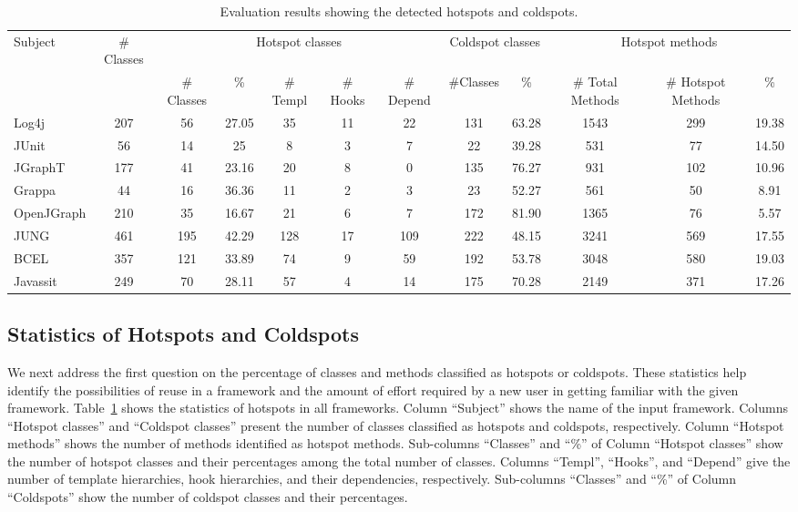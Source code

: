 \documentclass[conference]{IEEEtran}
\newenvironment{CodeOut}{\begin{small}}{\end{small}}
\begin{document}
\setlength{\tabcolsep}{1pt}
\begin{table}[t]
\begin{CodeOut}
\begin{center}
\centering \caption {\label{tab:hotanddead} Evaluation results showing the
detected hotspots and coldspots.}
\begin {tabular} {|l|c|c|c|c|c|c|c|c|c|c|c|}
\hline
Subject&\# Classes&\multicolumn{5}{|c|}{Hotspot classes}&\multicolumn{2}{|c|}{Coldspot classes}&\multicolumn{3}{|c|}{Hotspot methods}\\
\cline{3-12}
&&\# Classes&\%&\# Templ&\# Hooks&\# Depend&\#Classes&\%&\# Total Methods&\# Hotspot Methods&\%\\
\hline Log4j        &207&56&27.05&35&11&22&131&63.28&1543&299&19.38\\
\hline JUnit            &56&14&25&8&3&7&22&39.28&531&77&14.50\\
\hline JGraphT      &177&41&23.16&20&8&0&135&76.27&931&102&10.96\\
\hline Grappa           &44&16&36.36&11&2&3&23&52.27&561&50&8.91\\
\hline OpenJGraph   &210&35&16.67&21&6&7&172&81.90&1365&76&5.57\\
\hline JUNG             &461&195&42.29&128&17&109&222&48.15&3241&569&17.55\\
\hline BCEL             &357&121&33.89&74&9&59&192&53.78&3048&580&19.03\\
\hline Javassit     &249&70&28.11&57&4&14&175&70.28&2149&371&17.26\\
\hline
\end{tabular}
\end{center}
\end{CodeOut}
\end{table}
\subsection{Statistics of Hotspots and Coldspots}
\label{sec:hotspotsres}
We next address the first question on the percentage of classes and methods classified
as hotspots or coldspots. These statistics help identify the possibilities of reuse in a framework
and the amount of effort required by a new user in getting familiar with the given framework.
Table~\ref{tab:hotanddead} shows the statistics of hotspots in all frameworks.
Column ``Subject'' shows the name of the input framework. Columns ``Hotspot classes''
and ``Coldspot classes'' present the number of classes classified as hotspots and
coldspots, respectively. Column ``Hotspot methods'' shows the number of methods identified
as hotspot methods. Sub-columns ``Classes'' and ``\%'' of Column ``Hotspot classes'' show the number of hotspot classes
and their percentages among the total number of classes. Columns ``Templ'', ``Hooks'', and ``Depend''
give the number of template hierarchies, hook hierarchies, and their dependencies, respectively. Sub-columns
``Classes'' and ``\%'' of Column ``Coldspots'' show the number of coldspot classes and their percentages.
\end{document}
